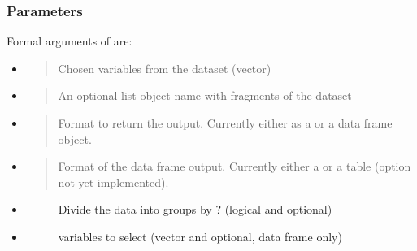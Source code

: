 \documentclass[a4paper,12pt,english]{sphinxhowto}
\begin{document}
\subsubsection{Parameters}
\label{\detokenize{EDHVariables:parameters}}
Formal arguments of  are:
\begin{itemize}
\item {} 
\begin{quote}

Chosen variables from the  dataset (vector)
\end{quote}

\item {} 
\begin{quote}

An optional list object name with fragments of the  dataset
\end{quote}

\item {} 
\begin{quote}

Format to return the output. Currently either as a  or a data frame  object.
\end{quote}

\item {} 
\begin{quote}

Format of the data frame output. Currently  either a  or a  table (option  not yet implemented).
\end{quote}

\item {} \begin{description}
\item[{}] \leavevmode
Divide the data into groups by ? (logical and optional)

\end{description}

\item {} \begin{description}
\item[{}] \leavevmode
{} variables to select (vector and optional, data frame   only)


\end{description}
\end{itemize}
\end{document}
